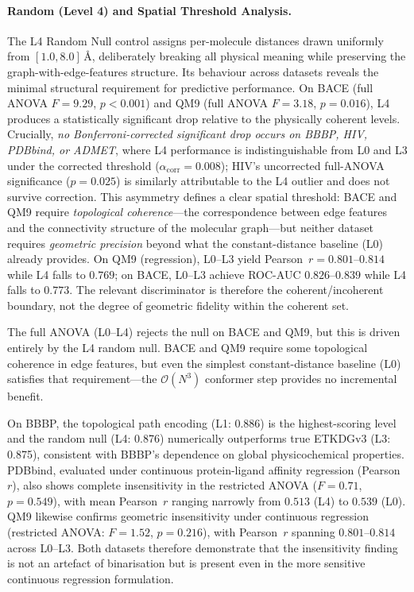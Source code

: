 \documentclass[pdflatex,sn-vancouver-num]{sn-jnl}%
\theoremstyle{thmstyleone}%
\theoremstyle{thmstyletwo}%
\theoremstyle{thmstylethree}%
\begin{document}
\paragraph{Random (Level 4) and Spatial Threshold Analysis.}
The L4 Random Null control assigns per-molecule distances drawn uniformly from $[1.0, 8.0]$\,\AA{}, deliberately breaking all physical meaning while preserving the graph-with-edge-features structure.  Its behaviour across datasets reveals the minimal structural requirement for predictive performance.  On BACE (full ANOVA $F = 9.29$, $p < 0.001$) and QM9 (full ANOVA $F = 3.18$, $p = 0.016$), L4 produces a statistically significant drop relative to the physically coherent levels.  Crucially, \emph{no Bonferroni-corrected significant drop occurs on BBBP, HIV, PDBbind, or ADMET}, where L4 performance is indistinguishable from L0 and L3 under the corrected threshold ($\alpha_{\mathrm{corr}} = 0.008$); HIV's uncorrected full-ANOVA significance ($p = 0.025$) is similarly attributable to the L4 outlier and does not survive correction.  This asymmetry defines a clear spatial threshold: BACE and QM9 require \emph{topological coherence}---the correspondence between edge features and the connectivity structure of the molecular graph---but neither dataset requires \emph{geometric precision} beyond what the constant-distance baseline (L0) already provides.  On QM9 (regression), L0--L3 yield Pearson~$r = 0.801$--$0.814$ while L4 falls to $0.769$; on BACE, L0--L3 achieve ROC-AUC $0.826$--$0.839$ while L4 falls to $0.773$.  The relevant discriminator is therefore the coherent/incoherent boundary, not the degree of geometric fidelity within the coherent set.

The full ANOVA (L0--L4) rejects the null on BACE and QM9, but this is
driven entirely by the L4 random null.  BACE and QM9 require some
topological coherence in edge features, but even the simplest
constant-distance baseline (L0) satisfies that requirement---the
$\mathcal{O}(N^3)$ conformer step provides no incremental benefit.

On BBBP, the topological path encoding (L1: 0.886) is the highest-scoring
level and the random null (L4: 0.876) numerically outperforms true
ETKDGv3 (L3: 0.875), consistent with BBBP's dependence on global
physicochemical properties.  PDBbind, evaluated under continuous
protein-ligand affinity regression (Pearson~$r$), also shows complete insensitivity
in the restricted ANOVA ($F = 0.71$, $p = 0.549$), with mean Pearson~$r$
ranging narrowly from $0.513$ (L4) to $0.539$ (L0).  QM9 likewise
confirms geometric insensitivity under continuous regression (restricted
ANOVA: $F = 1.52$, $p = 0.216$), with Pearson~$r$ spanning $0.801$--$0.814$
across L0--L3.  Both datasets therefore demonstrate that the insensitivity
finding is not an artefact of binarisation but is present even in the
more sensitive continuous regression formulation.
\end{document}
